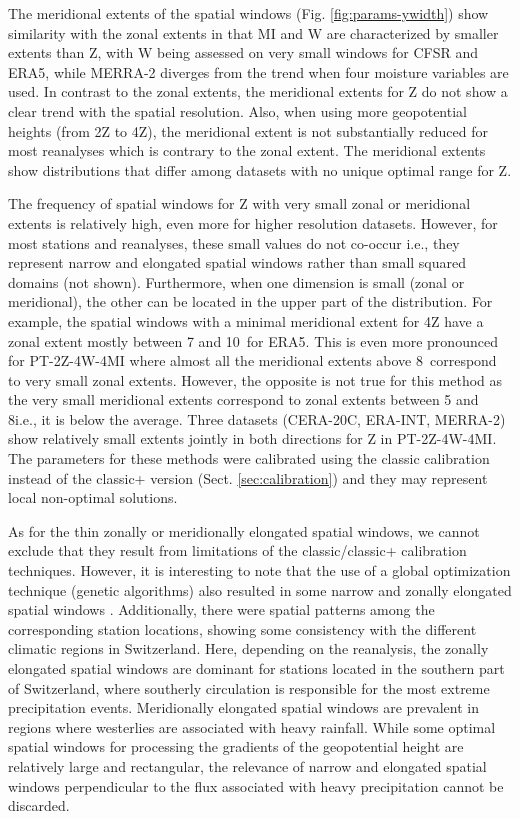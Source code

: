 \documentclass[alpha-refs]{wiley-article}
\begin{document}
The meridional extents of the spatial windows (Fig. \ref{fig:params-ywidth}) show similarity with the zonal extents in that MI and W are characterized by smaller extents than Z, with W being assessed on very small windows for CFSR and ERA5, while MERRA-2 diverges from the trend when four moisture variables are used. In contrast to the zonal extents, the meridional extents for Z do not show a clear trend with the spatial resolution. Also, when using more geopotential heights (from 2Z to 4Z), the meridional extent is not substantially reduced for most reanalyses which is contrary to the zonal extent. The meridional extents show distributions that differ among datasets with no unique optimal range for Z. 

The frequency of spatial windows for Z with very small zonal or meridional extents is relatively high, even more for higher resolution datasets. However, for most stations and reanalyses, these small values do not co-occur i.e., they represent narrow and elongated spatial windows rather than small squared domains (not shown). Furthermore, when one dimension is small (zonal or meridional), the other can be located in the upper part of the distribution. For example, the spatial windows with a minimal meridional extent for 4Z have a zonal extent mostly between 7 and 10\degree\ for ERA5. This is even more pronounced for PT-2Z-4W-4MI where almost all the meridional extents above 8\degree\ correspond to very small zonal extents. However, the opposite is not true for this method as the very small meridional extents correspond to zonal extents between 5 and 8\degree i.e., it is below the average. Three datasets (CERA-20C, ERA-INT, MERRA-2) show relatively small extents jointly in both directions for Z in PT-2Z-4W-4MI. The parameters for these methods were calibrated using the classic calibration instead of the classic+ version (Sect. \ref{sec:calibration}) and they may represent local non-optimal solutions. 

As for the thin zonally or meridionally elongated spatial windows, we cannot exclude that they result from limitations of the classic/classic+ calibration techniques. However, it is interesting to note that the use of a global optimization technique (genetic algorithms) also resulted in some narrow and zonally elongated spatial windows \citep{Horton2018a}. Additionally, there were spatial patterns among the corresponding station locations, showing some consistency with the different climatic regions in Switzerland. Here, depending on the reanalysis, the zonally elongated spatial windows are dominant for stations located in the southern part of Switzerland, where southerly circulation is responsible for the most extreme precipitation events. Meridionally elongated spatial windows are prevalent in regions where westerlies are associated with heavy rainfall. While some optimal spatial windows for processing the gradients of the geopotential height are relatively large and rectangular, the relevance of narrow and elongated spatial windows perpendicular to the flux associated with heavy precipitation cannot be discarded.
\end{document}
